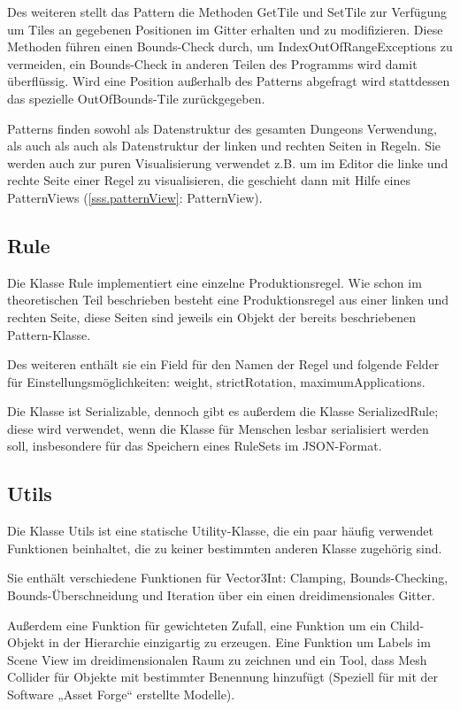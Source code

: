 Des weiteren stellt das Pattern die Methoden GetTile und SetTile zur Verfügung um Tiles an gegebenen Positionen im Gitter erhalten und zu modifizieren. Diese Methoden führen einen Bounds-Check durch, um IndexOutOfRangeExceptions zu vermeiden, ein Bounds-Check in anderen Teilen des Programms wird damit überflüssig. Wird eine Position außerhalb des Patterns abgefragt wird stattdessen das spezielle OutOfBounds-Tile zurückgegeben.

Patterns finden sowohl als Datenstruktur des gesamten Dungeons Verwendung, als auch als auch als Datenstruktur der linken und rechten Seiten in Regeln. Sie werden auch zur puren Visualisierung verwendet z.B. um im Editor die linke und rechte Seite einer Regel zu visualisieren, die geschieht dann mit Hilfe eines PatternViews (\ref{sss.patternView}: PatternView).

\subsection{Rule}

Die Klasse Rule implementiert eine einzelne Produktionsregel. Wie schon im theoretischen Teil beschrieben besteht eine Produktionsregel aus einer linken und rechten Seite, diese Seiten sind jeweils ein Objekt der bereits beschriebenen Pattern-Klasse.

Des weiteren enthält sie ein Field für den Namen der Regel und folgende Felder für Einstellungsmöglichkeiten: weight, strictRotation, maximumApplications.

Die Klasse ist Serializable, dennoch gibt es außerdem die Klasse SerializedRule; diese wird verwendet, wenn die Klasse für Menschen lesbar serialisiert werden soll, insbesondere für das Speichern eines RuleSets im JSON-Format. 

\subsection{Utils}

Die Klasse Utils ist eine statische Utility-Klasse, die ein paar häufig verwendet Funktionen beinhaltet, die zu keiner bestimmten anderen Klasse zugehörig sind.

Sie enthält verschiedene Funktionen für Vector3Int: Clamping, Bounds-Checking, Bounds-Überschneidung und Iteration über ein einen dreidimensionales Gitter.

Außerdem eine Funktion für gewichteten Zufall, eine Funktion um ein Child-Objekt in der Hierarchie einzigartig zu erzeugen. Eine Funktion um Labels im Scene View im dreidimensionalen Raum zu zeichnen und ein Tool, dass Mesh Collider für Objekte mit bestimmter Benennung hinzufügt (Speziell für mit der Software „Asset Forge“ erstellte Modelle).

